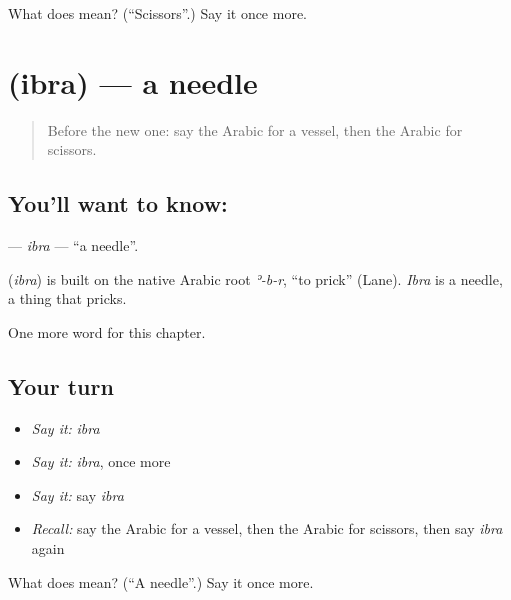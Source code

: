 \begin{tcolorbox}[breakable,colback=teal!4,colframe=teal!35!black,title={Before you move on}]
What does  mean? (\textquotedblleft{}Scissors\textquotedblright{}.) Say it once more.
\end{tcolorbox}
\section[\texorpdfstring{\ar{إبرة} (ibra)}{إبرة (ibra)}]{ (ibra) — a needle}

\label{lesson:AR-C124-ibra}



\begin{quote}
Before the new one: say the Arabic for a vessel, then the Arabic for scissors.
\end{quote}

\subsection*{You'll want to know: }
\textbf{} — \emph{ibra} — \textquotedblleft{}a needle\textquotedblright{}.

\begin{cousinweb}
\textbf{} (\emph{ibra}) is built on the native Arabic root \emph{ʾ-b-r}, \textquotedblleft{}to prick\textquotedblright{} (Lane). \emph{Ibra} is a needle, a thing that pricks.
\end{cousinweb}

\begin{grammarlens}[title={What you've built}]
One more word for this chapter.
\end{grammarlens}

\subsection*{Your turn}
\begin{itemize}
\raggedright
  \item \emph{Say it:} \emph{ibra}
  \item \emph{Say it:} \emph{ibra}, once more
  \item \emph{Say it:} say \emph{ibra}
  \item \emph{Recall:} say the Arabic for a vessel, then the Arabic for scissors, then say \emph{ibra} again
\end{itemize}

\begin{tcolorbox}[breakable,colback=teal!4,colframe=teal!35!black,title={Before you move on}]
What does  mean? (\textquotedblleft{}A needle\textquotedblright{}.) Say it once more.
\end{tcolorbox}
